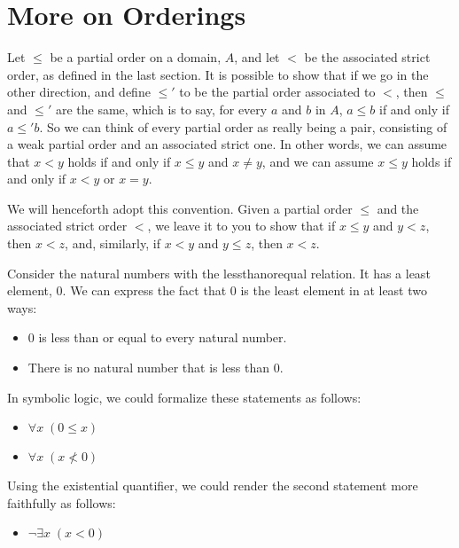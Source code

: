 \documentclass[letterpaper,10pt,english]{sphinxmanual}
\begin{document}
\section{More on Orderings}
\label{\detokenize{relations:more-on-orderings}}
\sphinxAtStartPar
Let \(\leq\) be a partial order on a domain, \(A\), and let \(<\) be the associated strict order, as defined in the last section. It is possible to show that if we go in the other direction, and define \(\leq'\) to be the partial order associated to \(<\), then \(\leq\) and \(\leq'\) are the same, which is to say, for every \(a\) and \(b\) in \(A\), \(a \leq b\) if and only if \(a \leq' b\). So we can think of every partial order as really being a pair, consisting of a weak partial order and an associated strict one. In other words, we can assume that \(x < y\) holds if and only if \(x \leq y\) and \(x \neq y\), and we can assume \(x \leq y\) holds if and only if \(x < y\) or \(x = y\).

\sphinxAtStartPar
We will henceforth adopt this convention. Given a partial order \(\leq\) and the associated strict order \(<\), we leave it to you to show that if \(x \leq y\) and \(y < z\), then \(x < z\), and, similarly, if \(x < y\) and \(y \leq z\), then \(x < z\).

\sphinxAtStartPar
Consider the natural numbers with the less\sphinxhyphen{}than\sphinxhyphen{}or\sphinxhyphen{}equal relation. It has a least element, \(0\). We can express the fact that \(0\) is the least element in at least two ways:
\begin{itemize}
\item {} 
\sphinxAtStartPar
\(0\) is less than or equal to every natural number.

\item {} 
\sphinxAtStartPar
There is no natural number that is less than \(0\).

\end{itemize}

\sphinxAtStartPar
In symbolic logic, we could formalize these statements as follows:
\begin{itemize}
\item {} 
\sphinxAtStartPar
\(\forall x \; (0 \leq x)\)

\item {} 
\sphinxAtStartPar
\(\forall x \; (x \nless 0)\)

\end{itemize}

\sphinxAtStartPar
Using the existential quantifier, we could render the second statement more faithfully as follows:
\begin{itemize}
\item {} 
\sphinxAtStartPar
\(\neg \exists x \; (x < 0)\)

\end{itemize}
\end{document}
